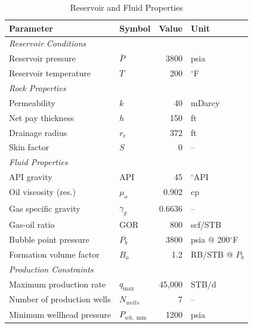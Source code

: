 \begin{table}[htbp]
    \centering
    \caption{Reservoir and Fluid Properties}
    \label{tab:reservoir_properties}
    \begin{tabular}{l l r l}
        \toprule
        \textbf{Parameter} & \textbf{Symbol} & \textbf{Value} & \textbf{Unit} \\
        \midrule
        \multicolumn{4}{l}{\textit{Reservoir Conditions}} \\
        \midrule
        Reservoir pressure       & $\bar{P}$  & 3800          & psia          \\
        Reservoir temperature    & $T$         & 200           & $^\circ$F     \\
        \midrule
        \multicolumn{4}{l}{\textit{Rock Properties}} \\
        \midrule
        Permeability             & $k$         & 40            & mDarcy        \\
        Net pay thickness        & $h$         & 150           & ft            \\
        Drainage radius          & $r_e$       & 372           & ft            \\
        Skin factor              & $S$         & 0             & --            \\
        \midrule
        \multicolumn{4}{l}{\textit{Fluid Properties}} \\
        \midrule
        API gravity              & API         & 45            & $^\circ$API   \\
        Oil viscosity (res.)     & $\mu_o$     & 0.902         & cp            \\
        Gas specific gravity     & $\gamma_g$  & 0.6636        & --            \\
        Gas-oil ratio            & GOR         & 800           & scf/STB       \\
        Bubble point pressure    & $P_b$       & 3800          & psia @ 200$^\circ$F \\
        Formation volume factor  & $B_o$       & 1.2           & RB/STB @ $P_b$ \\
        \midrule
        \multicolumn{4}{l}{\textit{Production Constraints}} \\
        Maximum production rate & $q_{\max}$   & 45,000        & STB/d         \\
        Number of production wells & $N_{wells}$ & 7            & --            \\
        Minimum wellhead pressure & $P_{wh,\min}$ & 1200        & psia          \\
        \bottomrule
    \end{tabular}
\end{table}

